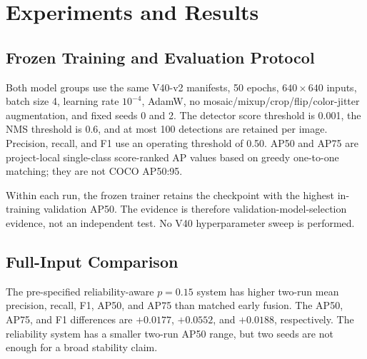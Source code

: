 \section{Experiments and Results}
\subsection{Frozen Training and Evaluation Protocol}
Both model groups use the same V40-v2 manifests, 50 epochs, $640\times640$ inputs, batch size 4, learning rate $10^{-4}$, AdamW, no mosaic/mixup/crop/flip/color-jitter augmentation, and fixed seeds 0 and 2. The detector score threshold is 0.001, the NMS threshold is 0.6, and at most 100 detections are retained per image. Precision, recall, and F1 use an operating threshold of 0.50. AP50 and AP75 are project-local single-class score-ranked AP values based on greedy one-to-one matching; they are not COCO AP50:95.

Within each run, the frozen trainer retains the checkpoint with the highest in-training validation AP50. The evidence is therefore validation-model-selection evidence, not an independent test. No V40 hyperparameter sweep is performed.

\subsection{Full-Input Comparison}
The pre-specified reliability-aware $p=0.15$ system has higher two-run mean precision, recall, F1, AP50, and AP75 than matched early fusion. The AP50, AP75, and F1 differences are $+0.0177$, $+0.0552$, and $+0.0188$, respectively. The reliability system has a smaller two-run AP50 range, but two seeds are not enough for a broad stability claim.

